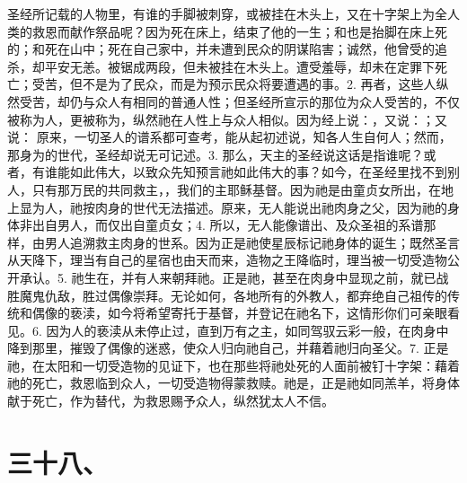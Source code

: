 圣经所记载的人物里，有谁的手脚被刺穿，或被挂在木头上，又在十字架上为全人类的救恩而献作祭品呢？因为死在床上，结束了他的一生；和也是抬脚在床上死的；和死在山中；死在自己家中，并未遭到民众的阴谋陷害；诚然，他曾受的追杀，却平安无恙。被锯成两段，但未被挂在木头上。遭受羞辱，却未在定罪下死亡；受苦，但不是为了民众，而是为预示民众将要遭遇的事。2. 再者，这些人纵然受苦，却仍与众人有相同的普通人性；但圣经所宣示的那位为众人受苦的，不仅被称为人，更被称为，纵然祂在人性上与众人相似。因为经上说：，又说：；又说： 原来，一切圣人的谱系都可查考，能从起初述说，知各人生自何人；然而，那身为的世代，圣经却说无可记述。3. 那么，天主的圣经说这话是指谁呢？或者，有谁能如此伟大，以致众先知预言祂如此伟大的事？如今，在圣经里找不到别人，只有那万民的共同救主，，我们的主耶稣基督。因为祂是由童贞女所出，在地上显为人，祂按肉身的世代无法描述。原来，无人能说出祂肉身之父，因为祂的身体非出自男人，而仅出自童贞女；4. 所以，无人能像谱出、及众圣祖的系谱那样，由男人追溯救主肉身的世系。因为正是祂使星辰标记祂身体的诞生；既然圣言从天降下，理当有自己的星宿也由天而来，造物之王降临时，理当被一切受造物公开承认。5. 祂生在，并有人来朝拜祂。正是祂，甚至在肉身中显现之前，就已战胜魔鬼仇敌，胜过偶像崇拜。无论如何，各地所有的外教人，都弃绝自己祖传的传统和偶像的亵渎，如今将希望寄托于基督，并登记在祂名下，这情形你们可亲眼看见。6. 因为人的亵渎从未停止过，直到万有之主，如同驾驭云彩一般，在肉身中降到那里，摧毁了偶像的迷惑，使众人归向祂自己，并藉着祂归向圣父。7. 正是祂，在太阳和一切受造物的见证下，也在那些将祂处死的人面前被钉十字架：藉着祂的死亡，救恩临到众人，一切受造物得蒙救赎。祂是，正是祂如同羔羊，将身体献于死亡，作为替代，为救恩赐予众人，纵然犹太人不信。\par


\section{三十八、}

